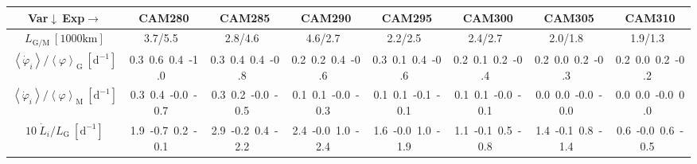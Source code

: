 \setlength\tabcolsep{1.5pt}

\begin{table}[H]
{\footnotesize
\begin{centering}
\begin{tabular}{|c|c|c|c|c|c|c|c|}
\hline
Var$\downarrow\ $Exp$\rightarrow$ & CAM280 & CAM285 & CAM290 & CAM295 & CAM300 & CAM305 & CAM310 \tabularnewline
\hline
\hline
$L_{\mathrm{G/M}}\ \left[1000\mathrm{km}\right]$ & 3.7/5.5\ & 2.8/4.6\ & 4.6/2.7\ & 2.2/2.5\ & 2.4/2.7\ & 2.0/1.8\ & 1.9/1.3\ \tabularnewline
\hline
$\left\langle \dot{\varphi}_{i}\right\rangle /\left\langle \varphi\right\rangle _{\mathrm{G}}\ \left[\mathrm{d^{-1}}\right]$ & \textcolor{C1}{0.3}\ \textcolor{C2}{0.6}\ \textcolor{C3}{0.4}\ \textcolor{C4}{-1.0}\  & \textcolor{C1}{0.3}\ \textcolor{C2}{0.4}\ \textcolor{C3}{0.4}\ \textcolor{C4}{-0.8}\  & \textcolor{C1}{0.2}\ \textcolor{C2}{0.2}\ \textcolor{C3}{0.4}\ \textcolor{C4}{-0.6}\  & \textcolor{C1}{0.3}\ \textcolor{C2}{0.1}\ \textcolor{C3}{0.4}\ \textcolor{C4}{-0.6}\  & \textcolor{C1}{0.2}\ \textcolor{C2}{0.1}\ \textcolor{C3}{0.2}\ \textcolor{C4}{-0.4}\  & \textcolor{C1}{0.2}\ \textcolor{C2}{0.0}\ \textcolor{C3}{0.2}\ \textcolor{C4}{-0.3}\  & \textcolor{C1}{0.2}\ \textcolor{C2}{0.0}\ \textcolor{C3}{0.2}\ \textcolor{C4}{-0.2}\  \tabularnewline
\hline
$\left\langle \dot{\varphi}_{i}\right\rangle /\left\langle \varphi\right\rangle _{\mathrm{M}}\ \left[\mathrm{d^{-1}}\right]$ & \textcolor{C1}{0.3}\ \textcolor{C2}{0.4}\ \textcolor{C3}{-0.0}\ \textcolor{C4}{-0.7}\  & \textcolor{C1}{0.3}\ \textcolor{C2}{0.2}\ \textcolor{C3}{-0.0}\ \textcolor{C4}{-0.5}\  & \textcolor{C1}{0.1}\ \textcolor{C2}{0.1}\ \textcolor{C3}{-0.0}\ \textcolor{C4}{-0.3}\  & \textcolor{C1}{0.1}\ \textcolor{C2}{0.1}\ \textcolor{C3}{-0.1}\ \textcolor{C4}{-0.1}\  & \textcolor{C1}{0.1}\ \textcolor{C2}{0.1}\ \textcolor{C3}{-0.0}\ \textcolor{C4}{-0.1}\  & \textcolor{C1}{0.0}\ \textcolor{C2}{0.0}\ \textcolor{C3}{-0.0}\ \textcolor{C4}{-0.0}\  & \textcolor{C1}{0.0}\ \textcolor{C2}{0.0}\ \textcolor{C3}{-0.0}\ \textcolor{C4}{0.0}\  \tabularnewline
\hline
$10\ \dot{L}_{i}/L_{\mathrm{G}}\ \left[\mathrm{d^{-1}}\right]$ & \textcolor{C1}{1.9}\ \textcolor{C2}{-0.7}\ \textcolor{C3}{0.2}\ \textcolor{C4}{-0.1}\  & \textcolor{C1}{2.9}\ \textcolor{C2}{-0.2}\ \textcolor{C3}{0.4}\ \textcolor{C4}{-2.2}\  & \textcolor{C1}{2.4}\ \textcolor{C2}{-0.0}\ \textcolor{C3}{1.0}\ \textcolor{C4}{-2.4}\  & \textcolor{C1}{1.6}\ \textcolor{C2}{-0.0}\ \textcolor{C3}{1.0}\ \textcolor{C4}{-1.9}\  & \textcolor{C1}{1.1}\ \textcolor{C2}{-0.1}\ \textcolor{C3}{0.5}\ \textcolor{C4}{-0.8}\  & \textcolor{C1}{1.4}\ \textcolor{C2}{-0.1}\ \textcolor{C3}{0.8}\ \textcolor{C4}{-1.4}\  & \textcolor{C1}{0.6}\ \textcolor{C2}{-0.0}\ \textcolor{C3}{0.6}\ \textcolor{C4}{-0.5}\  \tabularnewline

\end{tabular}
\end{centering}}
\end{table}
